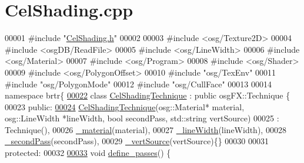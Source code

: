 \hypertarget{_cel_shading_8cpp_source}{\section{Cel\+Shading.\+cpp}
\label{_cel_shading_8cpp_source}
}

\begin{DoxyCode}
00001 \textcolor{preprocessor}{#include "\hyperlink{_cel_shading_8h}{CelShading.h}"}
00002 
00003 \textcolor{preprocessor}{#include <osg/Texture2D>}
00004 \textcolor{preprocessor}{#include <osgDB/ReadFile>}
00005 \textcolor{preprocessor}{#include <osg/LineWidth>}
00006 \textcolor{preprocessor}{#include <osg/Material>}
00007 \textcolor{preprocessor}{#include <osg/Program>}
00008 \textcolor{preprocessor}{#include <osg/Shader>}
00009 \textcolor{preprocessor}{#include <osg/PolygonOffset>}
00010 \textcolor{preprocessor}{#include "osg/TexEnv"}
00011 \textcolor{preprocessor}{#include "osg/PolygonMode"}
00012 \textcolor{preprocessor}{#include "osg/CullFace"}
00013 
00014 \textcolor{keyword}{namespace }brtr\{
\hypertarget{_cel_shading_8cpp_source_l00022}{}\hyperlink{classbrtr_1_1_cel_shading_technique}{00022}     \textcolor{keyword}{class }\hyperlink{classbrtr_1_1_cel_shading_technique}{CelShadingTechnique} : \textcolor{keyword}{public} osgFX::Technique \{
00023     \textcolor{keyword}{public}:
\hypertarget{_cel_shading_8cpp_source_l00024}{}\hyperlink{classbrtr_1_1_cel_shading_technique_a4c77c4f488907999068edd4d9b83aa4f}{00024}         \hyperlink{classbrtr_1_1_cel_shading_technique_a4c77c4f488907999068edd4d9b83aa4f}{CelShadingTechnique}(osg::Material* material, osg::LineWidth *lineWidth, \textcolor{keywordtype}{bool} 
      secondPass, std::string vertSource)
00025             : Technique(), 
00026             \hyperlink{classbrtr_1_1_cel_shading_technique_a266daa43a0effb4989755d61446dc14c}{\_material}(material),
00027             \hyperlink{classbrtr_1_1_cel_shading_technique_a2b943ddfe4db5a92b959217a8321584f}{\_lineWidth}(lineWidth),
00028             \hyperlink{classbrtr_1_1_cel_shading_technique_a096109e6280cd43bb55762509a3e9f0c}{\_secondPass}(secondPass),
00029             \hyperlink{classbrtr_1_1_cel_shading_technique_a52a36916162a24d0ddd66d371fa04057}{\_vertSource}(vertSource)\{\}
00030 
00031     \textcolor{keyword}{protected}:
00032 
\hypertarget{_cel_shading_8cpp_source_l00033}{}\hyperlink{classbrtr_1_1_cel_shading_technique_a7b44016e8ed4bc9c2c129b93de2f1f45}{00033}         \textcolor{keywordtype}{void} \hyperlink{classbrtr_1_1_cel_shading_technique_a7b44016e8ed4bc9c2c129b93de2f1f45}{define\_passes}() \{

\end{DoxyCode}
